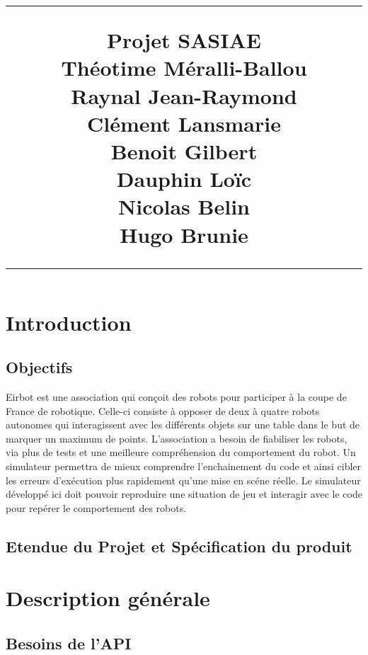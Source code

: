 \documentclass{scrreprt}
\title{%
\flushright
\rule{16cm}{5pt}
\vskip1cm
{\Huge Projet SASIAE}\\
\vspace{10cm}
{\small Théotime Méralli-Ballou\\ Raynal Jean-Raymond\\ Clément Lansmarie\\ Benoit Gilbert\\ Dauphin Loïc\\ Nicolas Belin\\ Hugo Brunie\\ }
\vfill
\rule{16cm}{5pt}
}
\date{}
\begin{document}
\maketitle
\tableofcontents

\chapter{Introduction}


\section{Objectifs}

    Eirbot est une association qui conçoit des robots pour participer à la coupe de France de robotique. Celle-ci consiste à opposer de deux à quatre robots autonomes qui interagissent avec les différents objets sur une table dans le but de marquer un maximum de points. L'association a besoin de fiabiliser les robots, via plus de tests et une meilleure compréhension du comportement du robot. Un simulateur permettra de mieux comprendre l'enchainement du code et ainsi cibler les erreurs d'exécution plus rapidement qu'une mise en scéne réelle.
    Le simulateur développé ici doit pouvoir reproduire une situation de jeu et interagir avec le code pour repérer le comportement des robots.
    
    
\section{Etendue du Projet et Spécification du produit}





      \chapter{Description générale}        %
\newpage
\section{Besoins de l'API}

\end{document}
